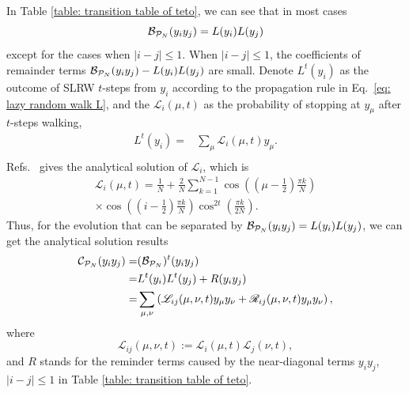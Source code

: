 \documentclass[journal=jctcce,a4paper,manuscript=article]{achemso}
\begin{document}
In Table \ref{table: transition table of teto}, we can see that in most cases
\begin{equation}
  \mathcal{B}_{\mathcal{P}_N}(y_i y_j) = L(y_i) L(y_j)
\end{equation}
except for the cases when $|i-j|\leq 1$.
When $|i-j|\leq 1$, the coefficients of remainder terms $\mathcal{B}_{\mathcal{P}_N}(y_i y_j) - L(y_i)L(y_j)$ are small.
Denote $L^t(y_i)$ as the outcome of SLRW $t$-steps from $y_i$ according to the propagation rule in Eq.~\eqref{eq: lazy random walk L}, and the $\mathcal{L}_{i}(\mu, t)$ as the probability of stopping at $y_\mu$ after $t$-steps walking,
\begin{equation}
  \begin{aligned}
    L^t(y_i) = & \sum_\mu \mathcal{L}_{i}(\mu, t) y_\mu. \\
  \end{aligned}
\end{equation}
Refs.~\cite{giuggioli2020exact} gives the analytical solution of $\mathcal{L}_{i}$, which is
\begin{equation}
  \begin{aligned}
    \mathcal{L}_{i}(\mu, t) = \frac{1}{N} + \frac{2}{N} \sum_{k=1}^{N-1} \cos \left(\left(\mu-\frac{1}{2}\right) \frac{\pi k}{N}\right) \\
    \times \cos \left(\left(i-\frac{1}{2}\right) \frac{\pi k}{N}\right) \cos^{2 t} \left(\frac{\pi k}{2 N}\right).
  \end{aligned}
\end{equation}
Thus, for the evolution that can be separated by $\mathcal{B}_{\mathcal{P}_N}(y_iy_j) = L(y_i) L(y_j)$, we can get the analytical solution results
\begin{align}
  \mathcal{C}_{\mathcal{P}_N} (y_i y_j) = & (\mathcal{B}_{\mathcal{P}_N})^t (y_i y_j)                                                                                                  \\
  =                                       & L^t(y_i)L^t(y_j) + R(y_iy_j)                                                                                         \\
  \label{eq: zz anonymous 7}
  =                                       & \sum_{\mu,\nu} \left(\mathscr{L}_{ij} (\mu, \nu, t) y_\mu y_\nu + \mathscr{R}_{ij} (\mu, \nu, t) y_\mu y_\nu\right),
\end{align}
where
\begin{equation}
  \mathscr{L}_{ij} (\mu, \nu, t) := \mathcal{L}_{i}(\mu, t)\mathcal{L}_{j}(\nu, t),
  \label{eq:L_ij_deviation}
\end{equation}
and $R$ stands for the reminder terms caused by the near-diagonal terms $y_i y_j$, $|i-j| \leq 1$ in Table \ref{table: transition table of teto}.
\end{document}
